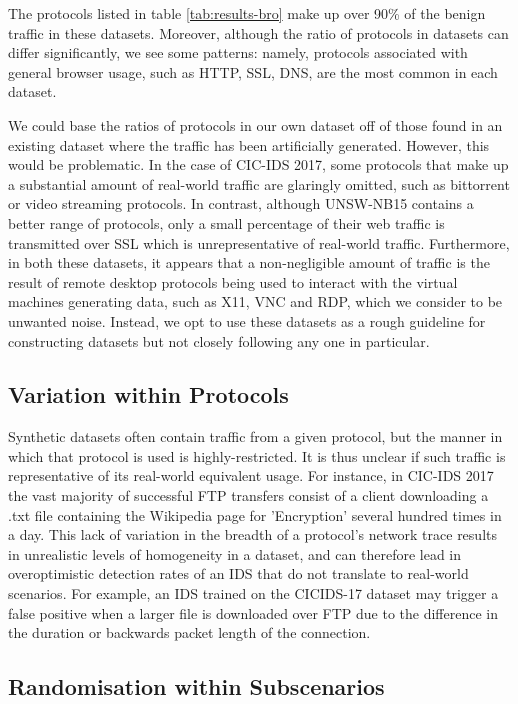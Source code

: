 \documentclass[sigconf,anonymous]{acmart}\usepackage[]{graphicx}\usepackage[]{color}
\begin{document}
The protocols listed in table \ref{tab:results-bro} make up over 90\% of the benign traffic in these datasets. Moreover, although the ratio of protocols in datasets can differ significantly, we see some patterns: namely, protocols associated with general browser usage, such as HTTP, SSL, DNS, are the most common in each dataset. 

We could base the ratios of protocols in our own dataset off of those found in an existing dataset where the traffic has been artificially generated. However, this would be problematic. In the case of CIC-IDS 2017, some protocols that make up a substantial amount of real-world traffic are glaringly omitted, such as bittorrent or video streaming protocols. In contrast, although UNSW-NB15 contains a better range of protocols, only a small percentage of their web traffic is transmitted over SSL which is  unrepresentative of real-world traffic. Furthermore, in both these datasets, it appears that a non-negligible amount of traffic is the result of remote desktop protocols being used to interact with the virtual machines generating data, such as X11, VNC and RDP, which we consider to be unwanted noise. Instead, we opt to use these datasets as a rough guideline for constructing datasets but not closely following any one in particular.

\subsection{Variation within Protocols}

Synthetic datasets often contain traffic from a given protocol, but the manner in which that protocol is used is highly-restricted. It is thus unclear if such traffic is representative of its real-world equivalent usage. For instance, in CIC-IDS 2017 the vast majority of successful FTP transfers consist of a client downloading a .txt file containing the Wikipedia page for 'Encryption' several hundred times in a day. This lack of variation in the breadth of a protocol's network trace results in unrealistic levels of homogeneity in a dataset, and can therefore lead in overoptimistic detection rates of an IDS that do not translate to real-world scenarios. For example, an IDS trained on the CICIDS-17 dataset may trigger a false positive when a larger file is downloaded over FTP due to the difference in the duration or backwards packet length of the connection. 



\subsection{Randomisation within Subscenarios}
\label{sec:randomsubscen}
\end{document}
